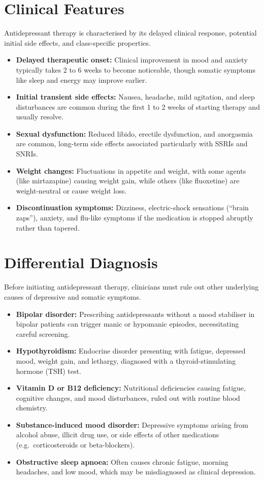 \section*{Clinical Features}
Antidepressant therapy is characterised by its delayed clinical response, potential initial side effects, and class-specific properties.
\begin{itemize}
    \item \textbf{Delayed therapeutic onset:} Clinical improvement in mood and anxiety typically takes 2 to 6 weeks to become noticeable, though somatic symptoms like sleep and energy may improve earlier.
    \item \textbf{Initial transient side effects:} Nausea, headache, mild agitation, and sleep disturbances are common during the first 1 to 2 weeks of starting therapy and usually resolve.
    \item \textbf{Sexual dysfunction:} Reduced libido, erectile dysfunction, and anorgasmia are common, long-term side effects associated particularly with SSRIs and SNRIs.
    \item \textbf{Weight changes:} Fluctuations in appetite and weight, with some agents (like mirtazapine) causing weight gain, while others (like fluoxetine) are weight-neutral or cause weight loss.
    \item \textbf{Discontinuation symptoms:} Dizziness, electric-shock sensations (``brain zaps''), anxiety, and flu-like symptoms if the medication is stopped abruptly rather than tapered.
\end{itemize}

\section*{Differential Diagnosis}
Before initiating antidepressant therapy, clinicians must rule out other underlying causes of depressive and somatic symptoms.
\begin{itemize}
    \item \textbf{Bipolar disorder:} Prescribing antidepressants without a mood stabiliser in bipolar patients can trigger manic or hypomanic episodes, necessitating careful screening.
    \item \textbf{Hypothyroidism:} Endocrine disorder presenting with fatigue, depressed mood, weight gain, and lethargy, diagnosed with a thyroid-stimulating hormone (TSH) test.
    \item \textbf{Vitamin D or B12 deficiency:} Nutritional deficiencies causing fatigue, cognitive changes, and mood disturbances, ruled out with routine blood chemistry.
    \item \textbf{Substance-induced mood disorder:} Depressive symptoms arising from alcohol abuse, illicit drug use, or side effects of other medications (e.g.\ corticosteroids or beta-blockers).
    \item \textbf{Obstructive sleep apnoea:} Often causes chronic fatigue, morning headaches, and low mood, which may be misdiagnosed as clinical depression.
\end{itemize}

